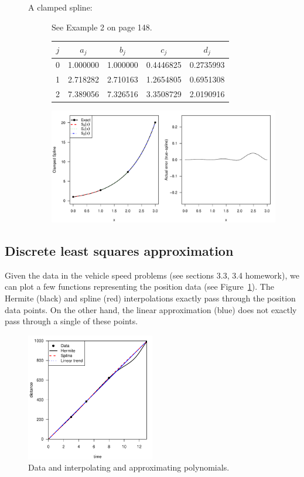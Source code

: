 \documentclass[11pt]{article}
\begin{document}
\begin{description}
\begin{description}
\vfill

\item[A clamped spline:] See Example 2 on page 148.
\begin{center}
\begin{tabular}{c|cccc}
\(j\) & \(a_j\) & \(b_j\) & \(c_j\) & \(d_j\)\\
\hline
\hline
0 & 1.000000 & 1.000000 & 0.4446825 & 0.2735993\\
1 & 2.718282 & 2.710163 & 1.2654805 & 0.6951308\\
2 & 7.389056 & 7.326516 & 3.3508729 & 2.0190916
\end{tabular}

\includegraphics[width=0.9\textwidth]{2_interpolation/clamped.pdf}

\end{center}
\end{description}
\end{description}

\subsection{Discrete least squares approximation}

Given the data in the vehicle speed problems (see sections 3.3, 3.4 homework), we can plot a few functions representing the position data (see Figure~\ref{fig::speed_plots}). The Hermite (black) and spline (red) interpolations exactly pass through the position data points. On the other hand, the linear approximation (blue) does not exactly pass through a single of these points.
%
\begin{figure}[ht!]\centering
\includegraphics[width=0.5\textwidth]{3_approximation/speed1.pdf}
\caption{Data and interpolating and approximating polynomials.}\label{fig::speed_plots}
\end{figure}
\end{document}

